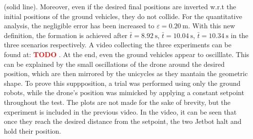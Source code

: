 \documentclass{ifacconf}
\newcommand{\TODO}[1]{
\textcolor{red}{\textbf{TODO} #1}
}
\begin{document}
(solid line).
Moreover, even if the desired final positions are inverted w.r.t the initial 
positions of the ground vehicles, they do not collide.
For the quantitative analysis, the negligible error 
has been increased to $\varepsilon = \SI{0.20}{\meter}$.
With this new definition, the formation is achieved after
$\bar{t} = \SI{8.92}{\second}$,
$\bar{t} = \SI{10.04}{\second}$,
$\bar{t} = \SI{10.34}{\second}$ in the three scenarios respectively.
A video collecting the three experiments can be found at:\TODO{}.
At the end, even the ground vehicles appear to oscilllate. 
This can be explained by the small oscillations of the drone around the desired position, 
which are then mirrored by the unicycles as they mantain the geometric shape.
To prove this suppposition, a trial was performed using only the ground robots, 
while the drone's position was mimicked by applying a constant setpoint 
throughout the test.
The plots are not made for the sake of brevity, but the experiment is 
included in the previous video.
In the video, it can be seen that once they reach the desired distance 
from the setpoint, the two Jetbot halt and hold their position.
\end{document}
